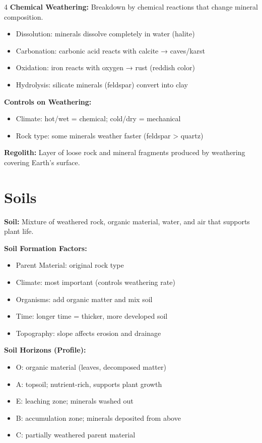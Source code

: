 \documentclass[10pt]{article}
\begin{document}
\begin{multicols}{4}
\textbf{Chemical Weathering:}
Breakdown by chemical reactions that change mineral composition.
\begin{itemize}
\item Dissolution: minerals dissolve completely in water (halite)
\item Carbonation: carbonic acid reacts with calcite → caves/karst
\item Oxidation: iron reacts with oxygen → rust (reddish color)
\item Hydrolysis: silicate minerals (feldspar) convert into clay
\end{itemize}

\textbf{Controls on Weathering:}
\begin{itemize}
\item Climate: hot/wet = chemical; cold/dry = mechanical
\item Rock type: some minerals weather faster (feldspar > quartz)
\end{itemize}

\textbf{Regolith:}
Layer of loose rock and mineral fragments produced by weathering covering Earth’s surface.

\section*{Soils}

\textbf{Soil:}
Mixture of weathered rock, organic material, water, and air that supports plant life.

\textbf{Soil Formation Factors:}
\begin{itemize}
\item Parent Material: original rock type
\item Climate: most important (controls weathering rate)
\item Organisms: add organic matter and mix soil
\item Time: longer time = thicker, more developed soil
\item Topography: slope affects erosion and drainage
\end{itemize}

\textbf{Soil Horizons (Profile):}
\begin{itemize}
\item O: organic material (leaves, decomposed matter)
\item A: topsoil; nutrient-rich, supports plant growth
\item E: leaching zone; minerals washed out
\item B: accumulation zone; minerals deposited from above
\item C: partially weathered parent material
\end{itemize}


\end{multicols}
\end{document}
